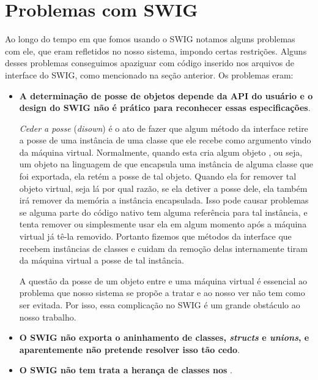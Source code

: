   
  \section{Problemas com SWIG}
  \label{cap:atividades:swig-sux}
  Ao longo do tempo em que fomos usando o SWIG notamos alguns problemas com ele, que eram
  refletidos no nosso sistema, impondo certas restrições. Alguns desses problemas conseguimos
  apaziguar com código inserido nos arquivos de interface do SWIG, como mencionado na seção
  anterior. Os problemas eram:
  
  \begin{itemize}
    \item \textbf{A determinação de posse de objetos depende da API do usuário e o design do SWIG
      não é prático para reconhecer essas especificações}.
      
      \textit{Ceder a posse} (\textit{disown}) é o ato de fazer que algum método da interface \CXX{}
      retire a posse de uma instância de uma classe \CXX{} que ele recebe como argumento vindo da
      máquina virtual. Normalmente, quando esta cria algum objeto \CXX{}, ou seja, um objeto
      na linguagem de 
      \script{} que encapsula uma instância de alguma classe \CXX{} que foi exportada, ela
      retém a posse de tal objeto. Quando ela for remover tal objeto virtual, seja 
      lá por qual razão, se ela detiver a posse dele, ela também irá remover da memória a
      instância \CXX{} encapsulada. Isso pode causar problemas se alguma parte do código nativo
      tem alguma referência para tal instância, e tenta remover ou simplesmente usar ela em algum
      momento após a máquina virtual já tê-la removido. Portanto fizemos que métodos
      da interface \CXX{} que recebem instâncias de classes e cuidam da remoção delas 
      internamente tiram da máquina virtual a posse de tal instância.
      
      A questão da posse de um objeto entre \CXX{} e uma máquina virtual é essencial ao
      problema que nosso sistema se propõe a tratar e ao nosso ver não tem como ser evitada.
      Por isso, essa complicação no SWIG é um grande obstáculo ao nosso trabalho.

    \item \textbf{O SWIG não exporta o aninhamento\footnotemark{} de classes,
      \textit{structs} e \textit{unions}, e aparentemente não pretende resolver isso tão cedo}.
      
    \item \textbf{O SWIG não tem trata a herança de classes \CXX{} nos }.
      

\end{itemize}
